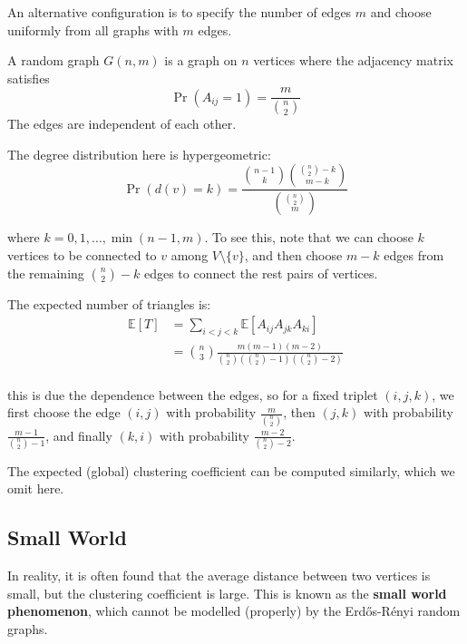\documentclass{article}
\begin{document}
An alternative configuration is to specify the number of edges $m$ and choose uniformly from all graphs with $m$ edges. 

\begin{definition}
    A random graph $G(n,m)$ is a graph on $n$ vertices where the adjacency matrix satisfies
    \begin{equation*}
        \Pr(A_{ij}=1)=\frac{m}{\binom{n}{2}}
    \end{equation*}
    The edges are independent of each other.
\end{definition}

The degree distribution here is hypergeometric:
$$
\Pr(d(v)=k)=\frac{\binom{n-1}{k}\binom{\binom{n}{2}-k}{m-k}}{\binom{\binom{n}{2}}{m}}
$$

where $k=0,1,\ldots,\min(n-1,m)$. To see this, note that we can choose $k$ vertices to be connected to $v$ among $V\setminus \{v\}$, and then choose $m-k$ edges from the remaining $\binom{n}{2}-k$ edges to connect the rest pairs of vertices. 

The expected number of triangles is:
\begin{align*}
    \mathbb{E}[T]&=\sum_{i<j<k} \mathbb{E}[A_{ij}A_{jk}A_{ki}]\\
    &=\binom{n}{3}\frac{m(m-1)(m-2)}{\binom{n}{2}\left(\binom{n}{2}-1\right)\left(\binom{n}{2}-2\right)}\\
\end{align*}

this is due the dependence between the edges, so for a fixed triplet $(i,j,k)$, we first choose the edge $(i,j)$ with probability $\frac{m}{\binom{n}{2}}$, then $(j,k)$ with probability $\frac{m-1}{\binom{n}{2}-1}$, and finally $(k,i)$ with probability $\frac{m-2}{\binom{n}{2}-2}$.  

The expected (global) clustering coefficient can be computed similarly, which we omit here.  

\subsection{Small World}

In reality, it is often found that the average distance between two vertices is small, but the clustering coefficient is large. This is known as the \textbf{small world phenomenon}, which cannot be modelled (properly) by the Erd\H{o}s-R\'{e}nyi random graphs.  
\end{document}
